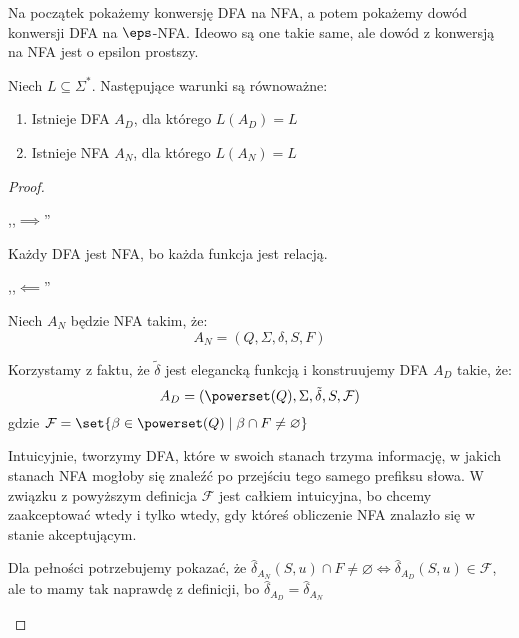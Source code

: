 Na początek pokażemy konwersję DFA na NFA, a potem pokażemy dowód konwersji DFA na \(\eps\)-NFA. Ideowo są one takie same, ale dowód z konwersją na NFA jest o epsilon prostszy.


\begin{theorem}
	Niech \( L \subseteq \Sigma^* \).
	Następujące warunki są równoważne:
	\begin{enumerate}
		\item Istnieje DFA \( A_D \), dla którego \( L(A_D) = L \)
		\item Istnieje NFA \( A_N \), dla którego \( L(A_N) = L \)
	\end{enumerate}
\end{theorem}
\begin{proof}
	\begin{description}
		\item ,,\( \implies \)''

		      Każdy DFA jest NFA, bo każda funkcja jest relacją.

		\item ,,\( \impliedby \)''

		      Niech \(A_N\) będzie NFA takim, że:
		      \[ A_N = (Q, \Sigma, \delta, S, F) \]

		      Korzystamy z faktu, że \( \tilde \delta \) jest elegancką funkcją i konstruujemy DFA \(A_D\) takie, że:
		      \[ A_D = (\powerset(Q), \Sigma, \tilde \delta, S, \mathcal{F}) \]
		      gdzie \( \mathcal{F} = \set{\beta \in \powerset(Q) \mid \beta \cap F \neq \varnothing} \)

		      Intuicyjnie, tworzymy DFA, które w swoich stanach trzyma informację, w jakich stanach NFA mogłoby się znaleźć po przejściu tego samego prefiksu słowa. W związku z powyższym definicja \( \mathcal{F} \) jest całkiem intuicyjna, bo chcemy zaakceptować wtedy i tylko wtedy, gdy któreś obliczenie NFA znalazło się w stanie akceptującym.

		      Dla pełności potrzebujemy pokazać, że \( \hat \delta_{A_N}(S, u) \cap F \neq \varnothing \iff \hat \delta_{A_D}(S, u) \in \mathcal{F} \),
		      ale to mamy tak naprawdę z definicji, bo \( \hat \delta_{A_D} = \hat \delta_{A_N} \)
	\end{description}
\end{proof}

